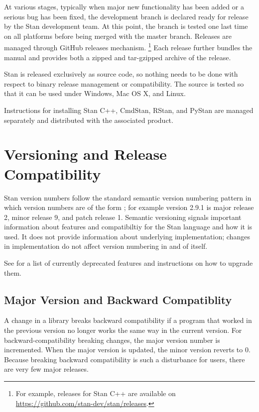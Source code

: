 At various stages, typically when major new functionality has been
added or a serious bug has been fixed, the development branch is
declared ready for release by the Stan development team. At this
point, the branch is tested one last time on all platforms before
being merged with the master branch. Releases are managed through
GitHub releases mechanism.%
%
\footnote{For example, releases for Stan C++ are available on
\url{https://github.com/stan-dev/stan/releases}.}
%
Each release further bundles the manual and provides both a zipped and
tar-gzipped archive of the release.

Stan is released exclusively as source code, so nothing needs to be
done with respect to binary release management or compatibility.  The
source is tested so that it can be used under Windows, Mac OS X, and
Linux.  

Instructions for installing Stan C++, CmdStan, RStan, and PyStan are
managed separately and distributed with the associated product.

\section{Versioning and Release Compatibility}\label{version-numbering.section}

Stan version numbers follow the standard semantic version numbering
pattern in which version numbers are of the form
; for example version 2.9.1 is major release
2, minor release 9, and patch release 1.  Semantic versioning signals
important information about features and compatibiltiy for the Stan
language and how it is used.   It does not provide information about
underlying implementation;  changes in implementation do not affect
version numbering in and of itself.

See  for a list of currently
deprecated features and instructions on how to upgrade them.

\subsection{Major Version and Backward Compatiblity}

A change in a library breaks backward compatibility if a program that
worked in the previous version no longer works the same way in the
current version.  For backward-compatibility breaking changes, the
major version number is incremented.  When the major version is
updated, the minor version reverts to 0.  Because breaking backward
compatibility is such a disturbance for users, there are very few
major releases.

